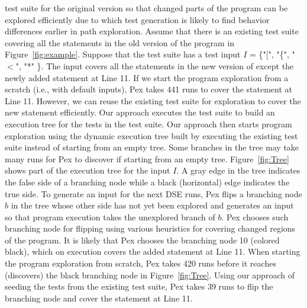 test suite for the original version so that changed parts of the program can be explored
efficiently due to which test generation is likely to find behavior
differences earlier in path exploration. Assume that there is an existing test suite covering all the statements in the old version of the program in Figure~\ref{fig:example}. Suppose that the test suite has a test input $I$ = \{"[", "\{", "$<$", "*" \}. The input covers all the statements in the new version of  except the newly added statement at Line 11. If we start the program exploration from a scratch (i.e., with default inputs), Pex takes 441 runs to cover the statement at Line 11. However, we can reuse the existing test suite for exploration to cover the new statement efficiently. Our approach executes the test suite to build an execution tree for the tests in the test suite. Our approach then starts program exploration using the dynamic execution tree built by executing the existing test suite instead of starting from an empty tree. Some branches in the tree may take many runs for Pex to discover if starting from an empty tree. Figure~\ref{fig:Tree} shows part of the execution tree for the input $I$. A gray edge in the tree indicates the false side of a branching node while a black (horizontal) edge indicates the true side. To generate an input for the next DSE runs, Pex flips a branching node $b$ in the tree whose other side has not yet been explored and generates an input so that program execution takes the unexplored branch of $b$. Pex chooses such branching node for flipping using various heuristics for covering changed regions of the program. It is likely that Pex chooses the branching node 10 (colored black), which on execution covers the added statement at Line 11. When starting the program exploration from scratch, Pex takes 420 runs before it reaches (discovers) the black branching node in Figure~\ref{fig:Tree}. Using our approach of seeding the tests from the existing test suite, Pex takes 39 runs to flip the branching node and cover the statement at Line 11.









